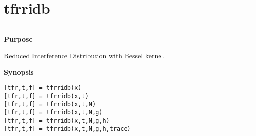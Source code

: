 

\section*{\hspace*{-1.6cm} tfrridb}

\vspace*{-.4cm}
\hspace*{-1.6cm}\rule[0in]{16.5cm}{.02cm}
\vspace*{.2cm}

{\bf \large \sf Purpose}\\
\hspace*{1.5cm}
\begin{minipage}[t]{13.5cm}
Reduced Interference Distribution with Bessel kernel.
\end{minipage}
\vspace*{.5cm}

{\bf \large \sf Synopsis}\\
\hspace*{1.5cm}
\begin{minipage}[t]{13.5cm}
\begin{verbatim}
[tfr,t,f] = tfrridb(x)
[tfr,t,f] = tfrridb(x,t)
[tfr,t,f] = tfrridb(x,t,N)
[tfr,t,f] = tfrridb(x,t,N,g)
[tfr,t,f] = tfrridb(x,t,N,g,h)
[tfr,t,f] = tfrridb(x,t,N,g,h,trace)
\end{verbatim}
\end{minipage}
\vspace*{.5cm}

